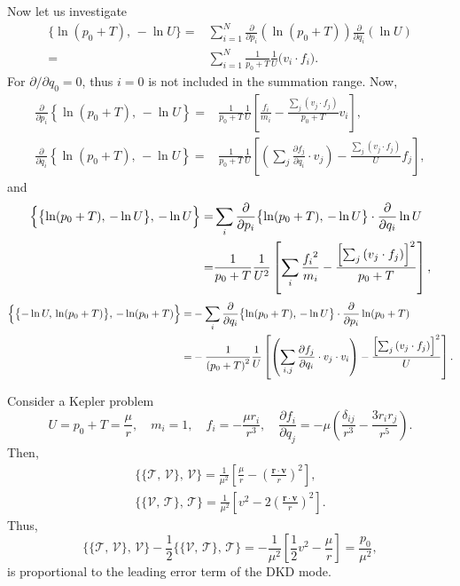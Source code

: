 \documentclass[11pt]{jsarticle}
\begin{document}
Now let us investigate
\begin{equation}
\begin{aligned}
\bigl\{ \ln (p_0 + T),\, -\ln U \bigr\} 
=& \sum_{i=1}^N
\frac{\partial}{\partial p_i} \left( \ln (p_0 + T) \right)
\frac{\partial}{\partial q_i} \left( \ln U \right) \\
=& \sum_{i=1}^N
\frac{1}{p_0 + T}\frac{1}{U} \bigl( v_i \cdot f_i \bigr).
\end{aligned}
\end{equation}
For $\partial / \partial q_0 = 0$, thus $i=0$ is not included in the summation range.
Now,
\begin{align}
\frac{\partial}{\partial p_i} \left\{ \ln (p_0 + T),\, -\ln U \right\} 
=&
\frac{1}{p_0 + T}\frac{1}{U}
\left[
	\frac{f_i}{m_i} - \frac{\sum_j \left( v_j \cdot f_j \right)}{p_0 + T} v_i  
\right],
\\
\frac{\partial}{\partial q_i} \left\{ \ln (p_0 + T),\, -\ln U \right\} 
=&
\frac{1}{p_0 + T}\frac{1}{U}
\left[
	\left( \sum_j \frac{\partial f_j}{\partial q_i} \cdot v_j \right)
	- \frac{\sum_j \left( v_j \cdot f_j \right)}{U} f_j
\right],
\end{align}
and
\begin{align}
\Bigl\{ \bigl\{ \ln (p_0 + T),\, -\ln U \bigr\},\, -\ln U \Bigr\}
=& 
	\sum_i \frac{\partial}{\partial p_i} \bigl\{ \ln (p_0 + T),\, -\ln U \bigr\}
	\cdot \frac{\partial}{\partial q_i} \ln U \nonumber \\
=&
	\frac{1}{p_0 + T}\frac{1}{U^2}
	\left[
		\sum_i \frac{{f_i}^2}{m_i} - \frac{{\left[\sum_j \left( v_j \cdot f_j \right)\right]}^2}{p_0 + T}
	\right],
\end{align}
\begin{align}
\Bigl\{ \bigl\{ -\ln U,\, \ln (p_0 + T) \bigr\},\, -\ln (p_0 + T) \Bigr\}
=& 
	-\sum_i \frac{\partial}{\partial q_i} \bigl\{ \ln (p_0 + T),\, -\ln U \bigr\}
	\cdot \frac{\partial}{\partial p_i} \ln (p_0 + T) \nonumber \\
=&
-\frac{1}{{(p_0 + T)}^2}\frac{1}{U}
	\left[
		\left( \sum_{i,j} \frac{\partial f_j}{\partial q_i} \cdot v_j \cdot v_i \right)
	-\frac{{\left[\sum_j \left( v_j \cdot f_j \right)\right]}^2}{U}
	\right].
\end{align}

Consider a Kepler problem
\[
U = p_0 + T = \frac{\mu}{r},\quad m_i=1, \quad f_i = - \frac{\mu r_i}{r^3}, \quad 
\frac{\partial f_i}{\partial q_j} = -\mu \left( \frac{\delta_{ij}}{r^3} - \frac{3 r_i r_j}{r^5} \right).
\]
Then,
\begin{align}
\{\{\mathcal T,\, \mathcal V \},\, \mathcal V\}
	= \frac{1}{\mu^2} \left[ \frac{\mu}{r} - {\left(\frac{\bm r \cdot \bm v}{r} \right)}^2 \right], \\
\{\{\mathcal V,\, \mathcal T \},\, \mathcal T\}
	= \frac{1}{\mu^2} \left[ v^2 - 2{\left(\frac{\bm r \cdot \bm v}{r} \right)}^2 \right].
\end{align}
Thus,
\begin{equation}
\{\{\mathcal T,\, \mathcal V \},\, \mathcal V\}
- \frac12
\{\{\mathcal V,\, \mathcal T \},\, \mathcal T\}
=
-\frac{1}{\mu^2}
\left[
	\frac12 v^2 - \frac{\mu}{r}
\right]
= \frac{p_0}{\mu^2},
\end{equation}
is proportional to the leading error term of the DKD mode.

\end{document}
